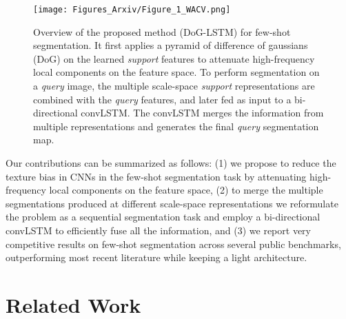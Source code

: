 \documentclass[runningheads]{llncs}
\begin{document}
\begin{figure*}[]
\centering
\texttt{[image: Figures\_Arxiv/Figure\_1\_WACV.png]}
\caption{Overview of the proposed method (DoG-LSTM) for few-shot segmentation. It first applies a pyramid of difference of gaussians (DoG) on the learned \textit{support} features to attenuate high-frequency local components on the feature space. To perform segmentation on a \textit{query} image, the multiple scale-space \textit{support} representations are combined with the \textit{query} features, and later fed as input to a bi-directional convLSTM. The convLSTM merges the information from multiple representations and generates the final \textit{query} segmentation map.} \label{fig:BConvLSTM}
\vspace*{-\baselineskip}
\label{fig:structure}
\end{figure*}


Our contributions can be summarized as follows: (1) we propose to reduce the texture bias in CNNs in the few-shot segmentation task by attenuating high-frequency local components on the feature space, (2) to merge the multiple segmentations produced at different scale-space representations we reformulate the problem as a sequential segmentation task and employ a bi-directional convLSTM to efficiently fuse all the information, and (3) we report very competitive results on few-shot segmentation across several public benchmarks, outperforming most recent literature while keeping a light architecture. 



















\section{Related Work}
\end{document}
